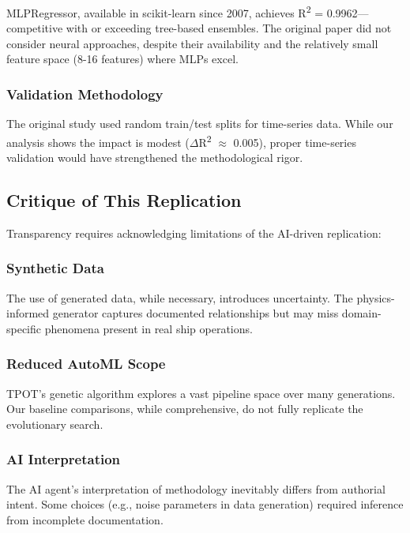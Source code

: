 \documentclass[conference]{IEEEtran}
\begin{document}
MLPRegressor, available in scikit-learn since 2007, achieves R\textsuperscript{2} = 0.9962---competitive with or exceeding tree-based ensembles. The original paper did not consider neural approaches, despite their availability and the relatively small feature space (8-16 features) where MLPs excel.

\subsubsection{Validation Methodology}

The original study used random train/test splits for time-series data. While our analysis shows the impact is modest ($\Delta$R\textsuperscript{2} $\approx$ 0.005), proper time-series validation would have strengthened the methodological rigor.

\subsection{Critique of This Replication}

Transparency requires acknowledging limitations of the AI-driven replication:

\subsubsection{Synthetic Data}

The use of generated data, while necessary, introduces uncertainty. The physics-informed generator captures documented relationships but may miss domain-specific phenomena present in real ship operations.

\subsubsection{Reduced AutoML Scope}

TPOT's genetic algorithm explores a vast pipeline space over many generations. Our baseline comparisons, while comprehensive, do not fully replicate the evolutionary search.

\subsubsection{AI Interpretation}

The AI agent's interpretation of methodology inevitably differs from authorial intent. Some choices (e.g., noise parameters in data generation) required inference from incomplete documentation.
\end{document}
